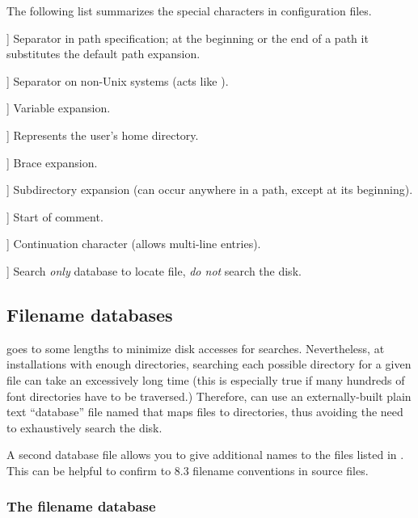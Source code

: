 \documentclass{article}
\begin{document}
The following list summarizes the special characters in \KPS{}
configuration files.

\newcommand{\CODE}[1]{\makebox[3em][l]{\code{#1}}}
\begin{ttdescription}
\item[\CODE{:}] Separator in path specification; at the beginning or
  the end of a path it substitutes the default path expansion.\par
\item[\CODE{;}] Separator on non-Unix systems (acts like \code{:}).
\item[\CODE{\$}] Variable expansion.
\item[\CODE{\string~}] Represents the user's home directory.
\item[\CODE{\char`\{...\char`\}}] Brace expansion.
\item[\CODE{//}] Subdirectory expansion (can occur anywhere in
    a path, except at its beginning).
\item[\CODE{\%}] Start of comment.
\item[\CODE{\bs}] Continuation character (allows multi-line entries).
\item[\CODE{!!}] Search \emph{only} database to locate file, \emph{do
    not} search the disk.
\end{ttdescription}


\subsection{Filename databases}
\label{sec:filename-database}

\KPS{} goes to some lengths to minimize disk accesses for searches.
Nevertheless, at installations with enough directories, searching each
possible directory for a given file can take an excessively long time
(this is especially true if many hundreds of font directories have to
be traversed.)  Therefore, \KPS{} can use an externally-built plain text
``database'' file named  that maps files to directories,
thus avoiding the need to exhaustively search the disk.

A second database file  allows you to give additional
names to the files listed in .  This can be helpful to
confirm to  8.3 filename conventions in source files.

\subsubsection{The filename database}
\label{sec:ls-R}
\end{document}
